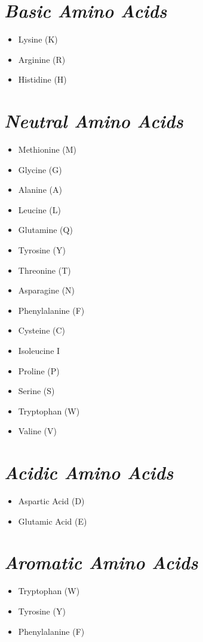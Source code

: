 \documentclass{article}
\begin{document}
\section*{\textit{Basic Amino Acids}}
\begin{itemize}
    \item Lysine (K)
    \item Arginine (R)
    \item Histidine (H)
\end{itemize}

\section*{\textit{Neutral Amino Acids}}
\begin{itemize}
    \item Methionine (M)
    \item Glycine (G)
    \item Alanine (A)
    \item Leucine (L)
    \item Glutamine (Q)
    \item Tyrosine (Y)
    \item Threonine (T)
    \item Asparagine (N)
    \item Phenylalanine (F)
    \item Cysteine (C)
    \item Isoleucine {I}
    \item Proline (P)
    \item Serine (S)
    \item Tryptophan (W)
    \item Valine (V)
\end{itemize}

\section*{\textit{Acidic Amino Acids}}
\begin{itemize}
    \item Aspartic Acid (D)
    \item Glutamic Acid (E)
\end{itemize}
\newpage
\section*{\textit{Aromatic Amino Acids}}
\begin{itemize}
    \item Tryptophan (W)
    \item Tyrosine (Y)
    \item Phenylalanine (F)
\end{itemize}
\end{document}
